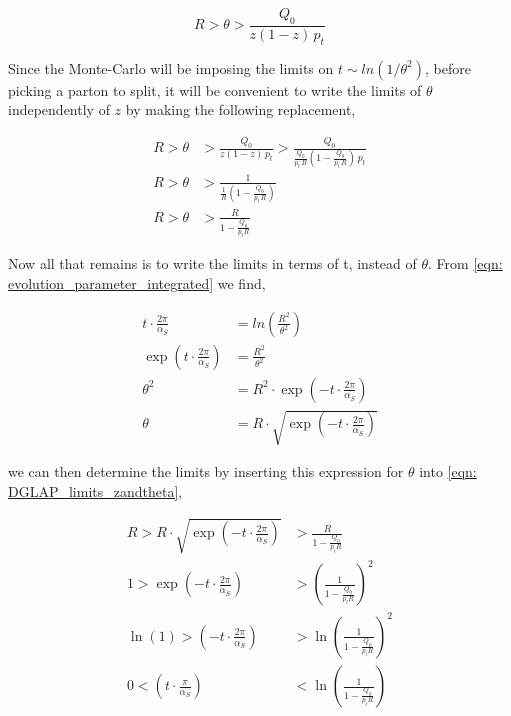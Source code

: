 \documentclass[main.tex]{subfiles}
\begin{document}
\begin{equation}
     R>\theta >\frac{Q_0}{z(1-z)\, p_t} %
\end{equation}

Since the Monte-Carlo will be imposing the limits on \(t \sim ln(1/\theta^2) \), before picking a parton to split, it will be convenient to write the limits of \(\theta\) independently of \(z\) by making the following replacement,

\begin{align}
    R>\theta &>\frac{Q_0}{z(1-z)\, p_t} > \frac{Q_0}{\frac{Q_0}{p_t \, R}(1-\frac{Q_0}{p_t \, R})\, p_t} \nonumber\\
    R>\theta &>\frac{1}{\frac{1}{R} (1-\frac{Q_0}{p_t \, R})} \nonumber\\
    R>\theta &>\frac{R}{1 - \frac{Q_0}{p_t R}} \label{eqn: DGLAP_limits_zandtheta}
\end{align}

Now all that remains is to write the limits in terms of t, instead of \(\theta\). From \autoref{eqn: evolution_parameter_integrated} we find, 

\begin{align}
    t\cdot \frac{2\pi}{\alpha_S} &= ln\left(\frac{R^2}{\theta^2} \right) \nonumber \\
    \exp \left(t\cdot \frac{2\pi}{\alpha_S} \right) &= \frac{R^2}{\theta^2} \nonumber \\
    \theta^2 &= R^2 \cdot \exp \left(- t\cdot \frac{2\pi}{\alpha_S} \right) \nonumber \\
    \theta &= R \cdot \sqrt{\exp\left(-t\cdot \frac{2\pi}{\alpha_S}\right)}
\end{align}

we can then determine the limits by inserting this expression for \(\theta\) into \autoref{eqn: DGLAP_limits_zandtheta}, 

\begin{align}
    R> R \cdot \sqrt{\exp\left(-t\cdot \frac{2\pi}{\alpha_S}\right)} &>\frac{R}{1 - \frac{Q_0}{p_t R}} \nonumber \\
    1> \exp\left(-t\cdot \frac{2\pi}{\alpha_S}\right) &> \left(\frac{1}{1 - \frac{Q_0}{p_t R}}\right)^2 \nonumber \\
    \ln(1)> \left(-t\cdot \frac{2\pi}{\alpha_S}\right) &> \ln(\frac{1}{1 - \frac{Q_0}{p_t R}})^2 \nonumber \\
     0< \left(t\cdot \frac{\pi}{\alpha_S}\right) &< \ln(\frac{1}{1 - \frac{Q_0}{p_t R}}) 
\end{align}
\end{document}
